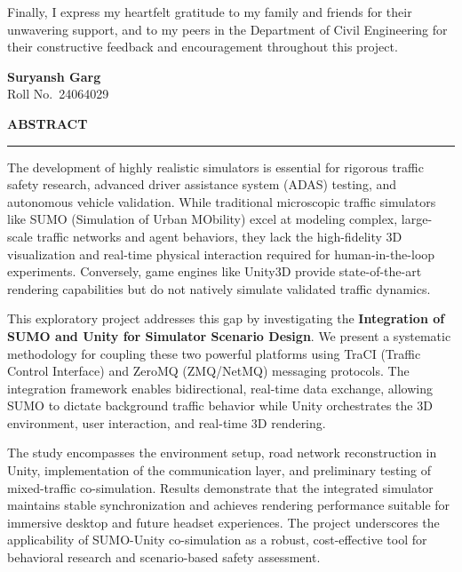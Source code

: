 \documentclass[12pt,a4paper,oneside]{report}
\begin{document}
Finally, I express my heartfelt gratitude to my family and friends for their unwavering support, and to my peers in the Department of Civil Engineering for their constructive feedback and encouragement throughout this project.

\vspace{2cm}

\hfill
\begin{minipage}[t]{0.45\textwidth}
\centering
\textbf{Suryansh Garg}\\
{\color{LightSlate}\small Roll No.\ 24064029}
\end{minipage}

\newpage
\thispagestyle{empty}

\begin{center}
    {\color{PrimaryNavy}\fontsize{20}{24}\selectfont\bfseries ABSTRACT}\\[4pt]
    {\color{AccentTeal}\rule{3cm}{2pt}}
\end{center}
\vspace{0.8cm}

The development of highly realistic simulators is essential for rigorous traffic safety research, advanced driver assistance system (ADAS) testing, and autonomous vehicle validation. While traditional microscopic traffic simulators like SUMO (Simulation of Urban MObility) excel at modeling complex, large-scale traffic networks and agent behaviors, they lack the high-fidelity 3D visualization and real-time physical interaction required for human-in-the-loop experiments. Conversely, game engines like Unity3D provide state-of-the-art rendering capabilities but do not natively simulate validated traffic dynamics.

This exploratory project addresses this gap by investigating the \textbf{Integration of SUMO and Unity for Simulator Scenario Design}. We present a systematic methodology for coupling these two powerful platforms using TraCI (Traffic Control Interface) and ZeroMQ (ZMQ/NetMQ) messaging protocols. The integration framework enables bidirectional, real-time data exchange, allowing SUMO to dictate background traffic behavior while Unity orchestrates the 3D environment, user interaction, and real-time 3D rendering. 

The study encompasses the environment setup, road network reconstruction in Unity, implementation of the communication layer, and preliminary testing of mixed-traffic co-simulation. Results demonstrate that the integrated simulator maintains stable synchronization and achieves rendering performance suitable for immersive desktop and future headset experiences. The project underscores the applicability of SUMO-Unity co-simulation as a robust, cost-effective tool for behavioral research and scenario-based safety assessment.
\end{document}
